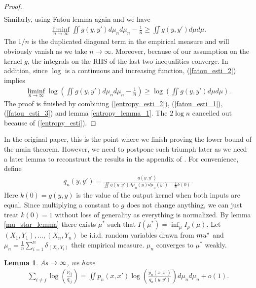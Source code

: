 \documentclass[10pt]{article}
\def\n{\noindent}
\def\n{\noindent}
\newtheorem{lemma}{\bf Lemma}
\newenvironment{Proof of lemma}{\noindent{\bf Proof of Lemma}}{\hfill$\Box$\newline}
\newenvironment{Proof of claim}{\noindent{\bf Proof of claim}}{\hfill$\Box$\newline}
\newenvironment{Proof of theorem}{\noindent{\bf Proof of Theorem}}{\hfill\scriptsize{$\Box$}\newline}
\newenvironment{Proof of theorems}{\noindent{\bf Proof of Theorems}}{\hfill$\Box$\newline}
\newenvironment{Proof of proposition}{\noindent{\bf Proof of Proposition}}{\hfill$\Box$\newline}
\newenvironment{Proof of propositions}{\noindent{\bf Proof of Propositions}}{\hfill$\Box$\newline}
\newenvironment{Proof of exercise}{\noindent{\it Proof of Exercise:}}{\hfill$\Box$}
\numberwithin{equation}{section}
\begin{document}
\begin{proof}
\begin{align}
    \end{align}
    Similarly, using Fatou lemma again and we have
    \begin{align} \label{fatou_esti_2}
        \liminf_{n \to \infty} \iint g(y,y') d\mu_n d\mu_n - \frac{1}{n} \geq \iint g(y,y')d\mu d\mu.
    \end{align}
    The $1/n$ is the duplicated diagonal term in the empirical measure and will obviously vanish as we take $n \to \infty$. Moreover, because of our assumption on the kernel $g$, the integrals on the RHS of the last two inequalities converge. In addition, since $\log$ is a continuous and increasing function, (\ref{fatou_esti_2}) implies
    \begin{align} \label{fatou_esti_3}
        \liminf_{n \to \infty} \log \left(\iint g(y,y') d\mu_n d\mu_n - \frac{1}{n}\right) \geq \log \left(\iint g(y,y')d\mu d\mu \right).
    \end{align}
    The proof is finished by combining (\ref{entropy_esti_2}), (\ref{fatou_esti_1}), (\ref{fatou_esti_3}) and lemma \ref{entropy_lemma_1}. The $2 \log n$ cancelled out because of (\ref{entropy_esti}).
\end{proof}
In the original paper, this is the point where we finish proving the lower bound of the main theorem. However, we need to postpone such triumph later as we need a later lemma to reconstruct the results in the appendix of \cite{auffinger-tsne}. For convenience, define
\begin{align}
    q_n(y,y') = \frac{g(y,y')}{\iint g(y,y')d \mu_n(y) d \mu_n (y') - \frac{1}{n}k(0)}.
\end{align}
Here $k(0) = g(y,y)$ is the value of the output kernel when both inputs are equal. Since multiplying a constant to $g$ does not change anything, we can just treat $k(0)=1$ without loss of generality as everything is normalized.
By lemma \ref{mu_star_lemma} there exists $\mu^*$ such that $I(\mu^*) = \inf_{\mu}I_{\rho}(\mu)$. Let $(X_1,Y_1), \dots, (X_n,Y_n)$ be i.i.d. random variables drawn from $\\mu^*$ and $\mu_n = \frac{1}{n} \sum_{i=1}^n \delta_{(X_i,Y_i)}$ their empirical measure. $\mu_n$ converges to $\mu^*$ weakly.
\begin{lemma} \label{int_approx_lemma_2}
    As $\n \to \infty$, we have
    \begin{align}
        \sum_{i \neq j} \log \left(\frac{p_{ij}}{q_{ij}}\right) = \iint p_n(x,x') \log \left(\frac{p_n(x,x')}{q_n(y,y')}\right) d\mu_n d\mu_n + o(1).
    \end{align}
\end{lemma}
\end{document}

